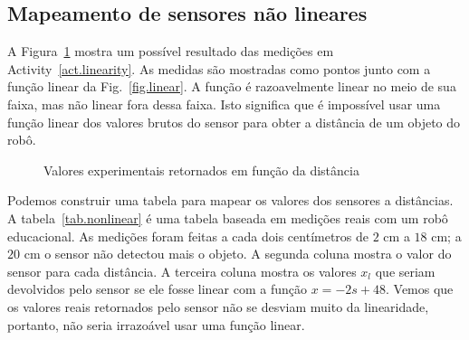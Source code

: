 {\subsection{Mapeamento de sensores não lineares}

A Figura~\ref{fig.nonlinear} mostra um possível resultado das medições em Activity~\ref{act.linearity}. As medidas são mostradas como pontos junto com a função linear da Fig.~\ref{fig.linear}. A função é razoavelmente linear no meio de sua faixa, mas não linear fora dessa faixa. Isto significa que é impossível usar uma função linear dos valores brutos do sensor para obter a distância de um objeto do robô.

\begin{figure}
\begin{center}
\caption{Valores experimentais retornados em função da distância}\label{fig.nonlinear}
\end{center}
\end{figure}

Podemos construir uma tabela para mapear os valores dos sensores a distâncias. A tabela~\ref{tab.nonlinear} é uma tabela baseada em medições reais com um robô educacional. As medições foram feitas a cada dois centímetros de $2$ cm a $18$ cm; a $20$ cm o sensor não detectou mais o objeto. A segunda coluna mostra o valor do sensor para cada distância. A terceira coluna mostra os valores $x_l$ que seriam devolvidos pelo sensor se ele fosse linear com a função $x=-2s+48$. Vemos que os valores reais retornados pelo sensor não se desviam muito da linearidade, portanto, não seria irrazoável usar uma função linear.

}
